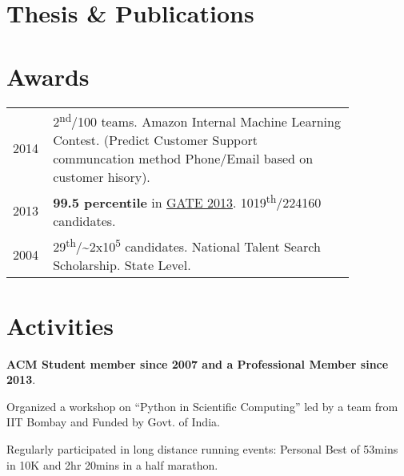 \documentclass[]{deedy-resume}
\begin{document}
\begin{minipage}[t]{0.66\textwidth}

\section{Thesis \& Publications} 
\renewcommand\refname{\vskip -1.5cm} %


\nocite{*}


\section{Awards} 
\begin{tabular}{p{0.05\linewidth}p{0.8\linewidth}}
2014  & 2\textsuperscript{nd}/100 teams. Amazon Internal Machine Learning Contest. (Predict Customer Support communcation method {Phone/Email} based on customer hisory). \\
2013  & \textbf{99.5 percentile}  in \href{http://www.gate.iitb.ac.in/gate2013/cs-syllabus/}{GATE 2013}. 1019\textsuperscript{th}/224160 candidates.\\
2004  & 29\textsuperscript{th}/\textasciitilde2x10\textsuperscript{5} candidates. National Talent Search Scholarship. State Level.\\

\end{tabular}
\sectionsep


\section{Activities} 
\vspace{\topsep} %
\begin{tightemize}
\item \textbf{ACM Student member since 2007 and a Professional Member since 2013}.
\item Organized a workshop on “Python in Scientific Computing” led by a team from IIT Bombay and Funded by Govt. of India.
\item Regularly participated in long distance running events: Personal Best of 53mins in 10K and 2hr 20mins in a half marathon.
\end{tightemize}



\end{minipage} 
\end{document}
